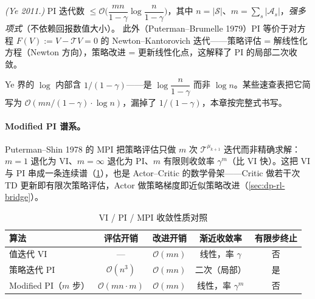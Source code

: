 \begin{theorem}[Ye 强多项式界 / PI = Newton]\label{thm:dp-ye-newton}
\emph{(Ye 2011\cite{ye2011simplex}.)} PI 迭代数 $\le\mathcal O\!\Big(\dfrac{mn}{1-\gamma}\log\dfrac{n}{1-\gamma}\Big)$，其中 $n=|\mathcal S|$、$m=\sum_s|\mathcal A_s|$，\emph{强多项式}（不依赖回报数值大小）。
此外（Puterman--Brumelle 1979\cite{puterman1979pi}）PI 等价于对方程 $F(V):=V-\mathcal TV=0$ 的 Newton--Kantorovich 迭代——策略评估 = 解线性化方程（Newton 方向），策略改进 = 更新线性化点，这解释了 PI 的局部二次收敛。
\end{theorem}

\begin{remark}[E3 勘误]
Ye 界的 $\log$ 内部含 $1/(1-\gamma)$——是 $\log\dfrac{n}{1-\gamma}$ 而非 $\log n$。某些速查表把它简写为 $\mathcal O(mn/(1-\gamma)\cdot\log n)$，漏掉了 $1/(1-\gamma)$，本章按完整式书写。
\end{remark}

\paragraph{Modified PI 谱系。}Puterman--Shin 1978 的 MPI 把策略评估只做 $m$ 次 $\mathcal T^{\mu_{k+1}}$ 迭代而非精确求解：$m=1$ 退化为 VI、$m=\infty$ 退化为 PI、$m$ 有限则收敛率 $\gamma^m$（比 VI 快）。这把 VI 与 PI 串成一条连续谱（\cref{tab:dp-vi-pi-mpi}），也是 Actor--Critic 的数学骨架——Critic 做若干次 TD 更新即有限次策略评估，Actor 做策略梯度即近似策略改进（\cref{sec:dp-rl-bridge}）。

\begin{table}[H]\centering\small
\caption{VI / PI / MPI 收敛性质对照}
\label{tab:dp-vi-pi-mpi}
\begin{tabular}{lcccc}
\toprule
算法 & 评估开销 & 改进开销 & 渐近收敛率 & 有限步终止 \\
\midrule
值迭代 VI & --- & $\mathcal O(mn)$ & 线性，率 $\gamma$ & 否 \\
策略迭代 PI & $\mathcal O(n^3)$ & $\mathcal O(mn)$ & 二次（局部） & 是 \\
Modified PI（$m$ 步） & $\mathcal O(mn\cdot m)$ & $\mathcal O(mn)$ & 线性，率 $\gamma^m$ & 否 \\
\bottomrule
\end{tabular}
\end{table}

